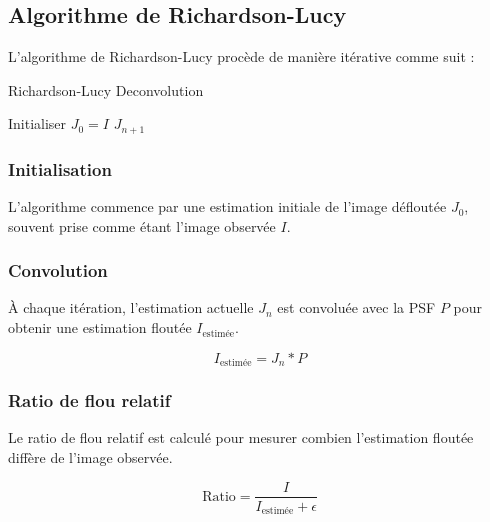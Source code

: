 \subsection{Algorithme de Richardson-Lucy}

L'algorithme de Richardson-Lucy procède de manière itérative comme suit :

\begin{algorithm}[H]
\caption{Richardson-Lucy Deconvolution}
Initialiser $J_0 = I$\;
\Return $J_{n+1}$\;
\end{algorithm}

\subsubsection{Initialisation}
L'algorithme commence par une estimation initiale de l'image défloutée \( J_0 \), souvent prise comme étant l'image observée \( I \).

\subsubsection{Convolution}
À chaque itération, l'estimation actuelle \( J_n \) est convoluée avec la PSF \( P \) pour obtenir une estimation floutée \( I_{\text{estimée}} \).

\begin{equation}
I_{\text{estimée}} = J_n \ast P
\end{equation}

\subsubsection{Ratio de flou relatif}
Le ratio de flou relatif est calculé pour mesurer combien l'estimation floutée diffère de l'image observée.

\begin{equation}
\text{Ratio} = \frac{I}{I_{\text{estimée}} + \epsilon}
\end{equation}

